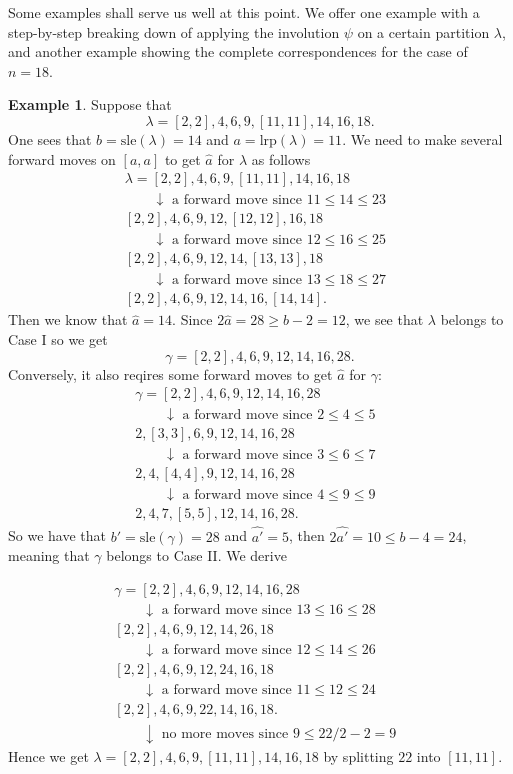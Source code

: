 \documentclass[11pt,reqno]{amsart}
\numberwithin{equation}{section}
\theoremstyle{plain}
\theoremstyle{definition}
\newtheorem{example}[theorem]{Example}
\def\la{\lambda}
\def\gam{\gamma}
\def\lrp{\mathrm{lrp}}
\def\sle{\mathrm{sle}}
\begin{document}
Some examples shall serve us well at this point. We offer one example with a step-by-step breaking down of applying the involution $\psi$ on a certain partition $\la$, and another example showing the complete correspondences for the case of $n=18$.

\begin{example}
Suppose that 
$$
\la=[2, 2], 4, 6, 9, [11, 11], 14, 16, 18.
$$
One sees that $b=\sle(\la)=14$ and $a=\lrp(\la)=11$. We need to make several forward moves on $[a,a]$ to get $\hat{a}$ for $\la$ as follows
\begin{align*}
\la=[2, 2], 4, 6, 9, [11, 11], 14, 16, 18 \\
\qquad \downarrow \text { a forward move since $11\leq 14\leq 23$ } \\
[2, 2], 4, 6, 9, 12, [12, 12], 16, 18\\
\qquad \downarrow \text { a forward move since $12\leq 16\leq 25$ } \\
[2, 2], 4, 6, 9, 12, 14, [13, 13], 18\\
\qquad \downarrow \text { a forward move since $13\leq 18\leq 27$ } \\
[2, 2], 4, 6, 9, 12, 14, 16, [14, 14]. 
\end{align*}
Then we know that $\hat{a}=14$. Since $2\hat{a}=28\geq b-2=12$, we see that $\la$ belongs to Case I so we get 
$$
\gam=[2, 2], 4, 6, 9, 12, 14, 16, 28.
$$
Conversely, it also reqires some forward moves to get $\hat{a}$ for $\gam$:
\begin{align*}
\gam=[2, 2], 4, 6, 9, 12, 14, 16, 28 \\
\qquad \downarrow \text { a forward move since $2\leq 4\leq 5$ } \\
2, [3, 3], 6, 9, 12, 14, 16, 28\\
\qquad \downarrow \text { a forward move since $3\leq 6\leq 7$ } \\
2, 4, [4, 4], 9, 12, 14, 16, 28\\
\qquad \downarrow \text { a forward move since $4\leq 9\leq 9$ } \\
2, 4, 7, [5, 5], 12, 14, 16, 28. 
\end{align*}
So we have that $b'=\sle(\gam)=28$ and $\hat{a'}=5$, then $2\hat{a'}=10\leq b-4=24$, meaning that $\gam$ belongs to Case II. We derive 

\begin{align*}
\gam=[2, 2], 4, 6, 9, 12, 14, 16, 28 \\
\qquad \downarrow \text { a forward move since $13\leq 16\leq 28$ } \\
[2, 2], 4, 6, 9, 12, 14, 26, 18\\
\qquad \downarrow \text { a forward move since $12\leq 14\leq 26$ } \\
[2, 2], 4, 6, 9, 12, 24, 16, 18\\
\qquad \downarrow \text { a forward move since $11\leq 12\leq 24$ } \\
[2, 2], 4, 6, 9, 22, 14, 16, 18.\\
\qquad \downarrow \text { no more moves since $9\le 22/2-2=9$ }
\end{align*}
Hence we get $\la=[2, 2], 4, 6, 9, [11, 11], 14, 16, 18
$ by splitting $22$ into $[11, 11]$.
\end{example}
\end{document}
